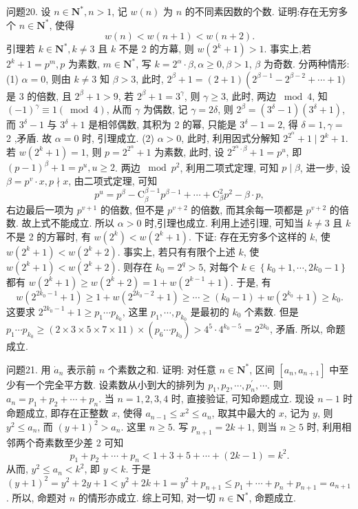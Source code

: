 问题20. 设 $n \in \mathbf{N}^*, n>1$, 记 $w(n)$ 为 $n$ 的不同素因数的个数.
证明:存在无穷多个 $n \in \mathbf{N}^*$, 使得
$$
w(n)<w(n+1)<w(n+2) .
$$
引理若 $k \in \mathbf{N}^*, k \neq 3$ 且 $k$ 不是 2 的方幕, 则 $w\left(2^k+1\right)>1$.
事实上,若 $2^k+1=p^m, p$ 为素数, $m \in \mathbf{N}^*$, 写 $k=2^\alpha \cdot \beta, \alpha \geqslant 0, \beta>1$, $\beta$ 为奇数.
分两种情形:
(1) $\alpha=0$, 则由 $k \neq 3$ 知 $\beta>3$, 此时, $2^\beta+1=(2+1)\left(2^{\beta-1}-2^{\beta-2}+\cdots+\right.1)$ 是 3 的倍数, 且 $2^\beta+1>9$, 若 $2^\beta+1=3^\gamma$, 则 $\gamma \geqslant 3$, 此时, 两边 $\bmod 4$, 知 $(-1)^\gamma \equiv 1(\bmod 4)$, 从而 $\gamma$ 为偶数, 记 $\gamma=2 \delta$, 则 $2^\beta=\left(3^\delta-1\right)\left(3^\delta+1\right)$, 而 $3^\delta-1$ 与 $3^\delta+1$ 是相邻偶数, 其积为 2 的幂, 只能是 $3^\delta-1=2$, 得 $\delta=1, \gamma=$ 2 ,矛盾.
故 $\alpha=0$ 时, 引理成立.
(2) $\alpha>0$, 此时, 利用因式分解知 $2^{2^\alpha}+1 \mid 2^k+1$. 若 $w\left(2^k+1\right)=1$, 则 $p=2^{2^\alpha}+1$ 为素数, 此时, 设 $2^{2^\alpha \cdot \beta}+1=p^u$, 即 $(p-1)^\beta+1=p^u, u \geqslant 2$. 两边 $\bmod p^2$, 利用二项式定理, 可知 $p \mid \beta$, 进一步, 设 $\beta=p^v \cdot x, p \nmid x$, 由二项式定理, 可知
$$
p^u=p^\beta-\mathrm{C}_\beta^{\beta-1} p^{\beta-1}+\cdots+\mathrm{C}_\beta^2 p^2-\beta \cdot p,
$$
右边最后一项为 $p^{v+1}$ 的倍数, 但不是 $p^{v+2}$ 的倍数, 而其余每一项都是 $p^{v+2}$ 的倍数.
故上式不能成立.
所以 $\alpha>0$ 时,引理也成立.
利用上述引理, 可知当 $k \neq 3$ 且 $k$ 不是 2 的方幂时, 有 $w\left(2^k\right)<w\left(2^k+1\right)$. 下证: 存在无穷多个这样的 $k$, 使 $w\left(2^k+1\right)<w\left(2^k+2\right)$.
事实上, 若只有有限个上述 $k$, 使 $w\left(2^k+1\right)<w\left(2^k+2\right)$. 则存在 $k_0= 2^q>5$, 对每个 $k \in\left\{k_0+1, \cdots, 2 k_0-1\right\}$ 都有 $w\left(2^k+1\right) \geqslant w\left(2^k+2\right)=1+ w\left(2^{k-1}+1\right)$. 于是, 有
$$
w\left(2^{2 k_0-1}+1\right) \geqslant 1+w\left(2^{2 k_0-2}+1\right) \geqslant \cdots \geqslant\left(k_0-1\right)+w\left(2^{k_0}+1\right) \geqslant k_0 .
$$
这要求 $2^{2 k_0-1}+1 \geqslant p_1 \cdots p_{k_0}$, 这里 $p_1, \cdots, p_{k_0}$ 是最初的 $k_0$ 个素数.
但是 $p_1 \cdots p_{k_0} \geqslant(2 \times 3 \times 5 \times 7 \times 11) \times\left(p_6 \cdots p_{k_0}\right)>4^5 \cdot 4^{k_0-5}=2^{2 k_0}$, 矛盾.
所以, 命题成立.



问题21. 用 $\dot{a}_n$ 表示前 $n$ 个素数之和.
证明: 对任意 $n \in \mathbf{N}^*$, 区间 $\left[a_n, a_{n+1}\right]$ 中至少有一个完全平方数.
设素数从小到大的排列为 $p_1, p_2, \cdots, p_n^{\prime}, \cdots$. 则 $a_n=p_1+ p_2+\cdots+p_n$.
当 $n=1,2,3,4$ 时, 直接验证, 可知命题成立.
现设 $n-1$ 时命题成立, 即存在正整数 $x$, 使得 $a_{n-1} \leqslant x^2 \leqslant a_n$, 取其中最大的 $x$, 记为 $y$, 则 $y^2 \leqslant a_n$, 而 $(y+ 1)^2>a_n$. 这里 $n \geqslant 5$.
写 $p_{n+1}=2 k+1$, 则当 $n \geqslant 5$ 时, 利用相邻两个奇素数至少差 2 可知
$$
p_1+p_2+\cdots+p_n<1+3+5+\cdots+(2 k-1)=k^2 .
$$
从而, $y^2 \leqslant a_n<k^2$, 即 $y<k$. 于是 $(y+1)^2=y^2+2 y+1<y^2+2 k+1= y^2+p_{n+1} \leqslant p_1+\cdots+p_n+p_{n+1}=a_{n+1}$. 所以, 命题对 $n$ 的情形亦成立.
综上可知, 对一切 $n \in \mathbf{N}^*$, 命题成立.



